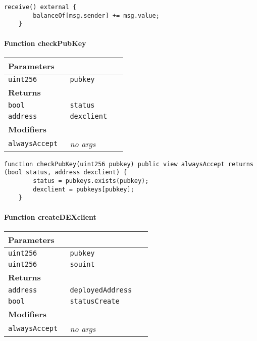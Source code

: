 \begin{lstlisting}[firstnumber=76]
	receive() external {
		balanceOf[msg.sender] += msg.value;
	}
\end{lstlisting}

\paragraph{Function checkPubKey}


\ifsoltables
\noindent\begin{tabular}{|l|l|p{5cm}|}\hline
\multicolumn{3}{|l|}{\bf Parameters}\\\hline
\tt uint256 & \tt pubkey &\\\hline
\multicolumn{3}{|l|}{\bf Returns}\\\hline
\tt bool & \tt status &\\\hline
\tt address & \tt dexclient &\\\hline
\multicolumn{3}{|l|}{\bf Modifiers}\\\hline
\tt alwaysAccept & {\em no args} &\\\hline
\end{tabular}
\fi

\vspace{2cm}

\begin{lstlisting}[firstnumber=328]
	function checkPubKey(uint256 pubkey) public view alwaysAccept returns (bool status, address dexclient) {
		status = pubkeys.exists(pubkey);
		dexclient = pubkeys[pubkey];
	}
\end{lstlisting}

\paragraph{Function createDEXclient}


\ifsoltables
\noindent\begin{tabular}{|l|l|p{5cm}|}\hline
\multicolumn{3}{|l|}{\bf Parameters}\\\hline
\tt uint256 & \tt pubkey &\\\hline
\tt uint256 & \tt souint &\\\hline
\multicolumn{3}{|l|}{\bf Returns}\\\hline
\tt address & \tt deployedAddress &\\\hline
\tt bool & \tt statusCreate &\\\hline
\multicolumn{3}{|l|}{\bf Modifiers}\\\hline
\tt alwaysAccept & {\em no args} &\\\hline
\end{tabular}
\fi

